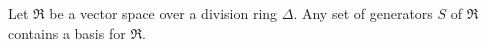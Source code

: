 Let $\Re$ be a vector space over a division ring $\Delta$. Any set of generators $S$ of $\Re$ contains a basis for $\Re$.
